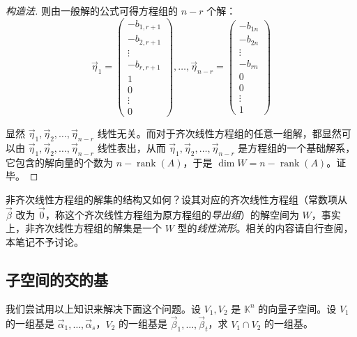 \begin{proof}[构造法]
	则由一般解的公式可得方程组的 $n - r$ 个解：
	$$
	\vec \eta_1 =
	\begin{pmatrix}
		-b_{1, r + 1} \\ -b_{2, r + 1} \\ \vdots \\ -b_{r, r + 1} \\ 1 \\ 0 \\ \vdots \\ 0
	\end{pmatrix},
	\ldots,
	\vec \eta_{n - r} =
	\begin{pmatrix}
		-b_{1n} \\ -b_{2n} \\ \vdots \\ -b_{rn} \\ 0 \\ 0 \\ \vdots \\ 1
	\end{pmatrix}
	$$

	显然 $\vec \eta_1, \vec \eta_2, \ldots, \vec \eta_{n - r}$ 线性无关。而对于齐次线性方程组的任意一组解，都显然可以由 $\vec \eta_1, \vec \eta_2, \ldots, \vec \eta_{n - r}$ 线性表出，从而 $\vec \eta_1, \vec \eta_2, \ldots, \vec \eta_{n - r}$ 是方程组的一个基础解系，它包含的解向量的个数为 $n - \operatorname{rank}(A)$，于是 $\dim W = n - \operatorname{rank}(A)$。证毕。
\end{proof}

非齐次线性方程组的解集的结构又如何？设其对应的齐次线性方程组（常数项从 $\vec \beta$ 改为 $\vec 0$，称这个齐次线性方程组为原方程组的\emph{导出组}）的解空间为 $W$，事实上，非齐次线性方程组的解集是一个 $W$ 型的\emph{线性流形}。相关的内容请自行查阅，本笔记不予讨论。

\subsection{子空间的交的基}

我们尝试用以上知识来解决下面这个问题。设 $V_1, V_2$ 是 $\mathbb K^n$ 的向量子空间。设 $V_1$ 的一组基是 $\vec \alpha_1, \ldots, \vec \alpha_s$，$V_2$ 的一组基是 $\vec \beta_1, \ldots, \vec \beta_t$，求 $V_1 \cap V_2$ 的一组基。

